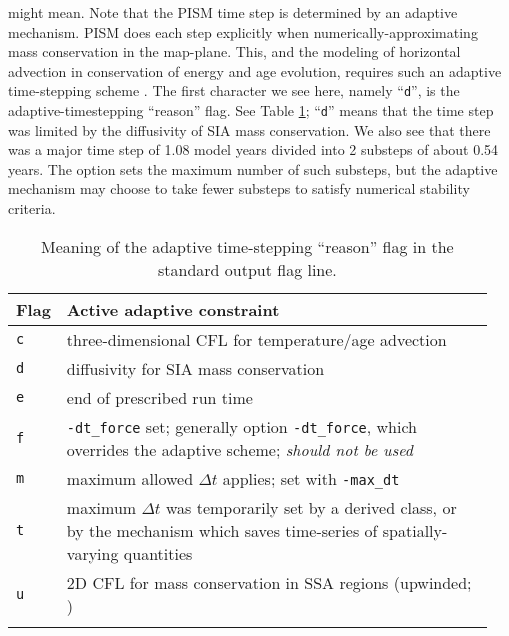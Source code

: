 \noindent might mean.  Note that the PISM time step is determined by an adaptive mechanism.  PISM does each step explicitly when numerically-approximating mass conservation in the map-plane.  This, and the modeling of horizontal advection in conservation of energy and age evolution, requires such an adaptive time-stepping scheme \cite{BBL}.  The first character we see here, namely ``\texttt{d}'', is the adaptive-timestepping ``reason'' flag.  See Table \ref{tab:adaptiveflag}; ``\texttt{d}'' means that the time step was limited by the diffusivity of SIA mass conservation.  We also see that there was a major time step of 1.08 model years divided into 2 substeps of about 0.54 years.  The  option sets the maximum number of such substeps, but the adaptive mechanism may choose to take fewer substeps to satisfy numerical stability criteria.

\begin{table}[ht]
\centering
\caption{Meaning of the adaptive time-stepping ``reason'' flag in the standard output flag line.}\label{tab:adaptiveflag}
\begin{tabular}{p{0.05\linewidth}p{0.9\linewidth}}\toprule
\textbf{Flag} & \textbf{Active adaptive constraint} \\ \midrule
\texttt{c} & three-dimensional CFL for temperature/age advection \cite{BBL} \\
\texttt{d} & diffusivity for SIA mass conservation \cite{BBL,HindmarshPayne} \\
\texttt{e} & end of prescribed run time \\
\texttt{f} & \texttt{-dt_force} set; generally option \texttt{-dt_force}, which overrides the adaptive scheme; \emph{should not be used}  \\
\texttt{m} & maximum allowed $\Delta t$ applies; set with \texttt{-max_dt} \\
\texttt{t} & maximum $\Delta t$ was temporarily set by a derived class, or by the mechanism which saves time-series of spatially-varying quantities \\
\texttt{u} & 2D CFL for mass conservation in SSA regions (upwinded; \cite{BBssasliding})\\
\bottomrule
\normalsize
\end{tabular}
\end{table}

